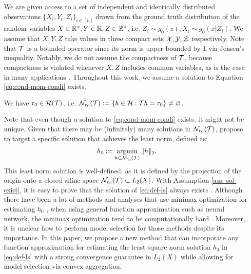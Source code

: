 We are given access to a set of independent and identically distributed observations $\{X_i, Y_i, Z_i\}_{i\in[n]}$ drawn
from the ground truth distribution of the random variables $X\in \mathbb{R}^x, Y \in \mathbb{R},Z\in \mathbb{R}^z$, i.e. $Z_i\sim g_0(z), X_i\sim g_0(x|Z_i)$. We assume that $X,Y,Z$ take values in three compact sets $\mathcal{X}, \mathcal{Y}, \mathcal{Z}$  respectively.  Note that ${\mathcal{T}}$ is a bounded operator since its norm is upper-bounded by $1$ via Jensen’s inequality. Notably,  we do not assume the compactness of ${\mathcal{T}}$, because compactness is violated whenever $X, Z$ includes common variables, as is the case in many applications \citep{deaner2018proxy,cui2020semiparametric}. Throughout this work, we assume a solution to Equation \eqref{eq:cond-mom-condi} exists.
\begin{assumption}\label{ass: sol-exist}
    We have $r_0 \in \mathcal{R}({\mathcal{T}})$, i.e.  $\mathcal{N}_{r_0}({\mathcal{T}}):=\{h\in \mathcal{H}: {\mathcal{T}} h = r_0\} \neq \varnothing$.
\end{assumption}
Note that even though a solution to \eqref{eq:cond-mom-condi} exists, it might not be unique. Given that there may be (infinitely) many solutions in $\mathcal{N}_{r_0}({\mathcal{T}})$, propose to target a specific solution that achieves the least norm, defined as:
\begin{align}\label{eq:def-ls}
    h_0 := \mathop{\mathrm{argmin}}_{h\in \mathcal{N}_{r_0}({\mathcal{T}})} \|h\|_2.
\end{align}
This least norm solution is well-defined, as it is defined by the projection of the origin onto a closed affine space
$\mathcal{N}_{r_0}({\mathcal{T}}) \subset L_2(X)$. With Assumption \ref{ass: sol-exist}, it is easy to prove that the solution of \eqref{eq:def-ls} always exists \citep[Lemma 1]{bennett2023minimax}. 
Although there have been a lot of methods and analyses that use minimax optimization for estimating $h_0$ \citep{DikkalaNishanth2020MEoC,lewis2018adversarial,bennett2023source}, when using general function approximation such as neural network, the minimax optimization tend to be computationally hard \citep{lin2020near,jin2020local,lin2020gradient,diakonikolas2021efficient,razaviyayn2020nonconvex}.  Moreover, it is unclear how to perform model selection for those methods despite its importance. In this paper, we propose a new method that can incorporate any function approximation for estimating the least square norm solution $h_0$ in \eqref{eq:def-ls} with a strong convergence guarantee in $L_2(X)$ while allowing for model selection via convex aggregation. 
\fi 





